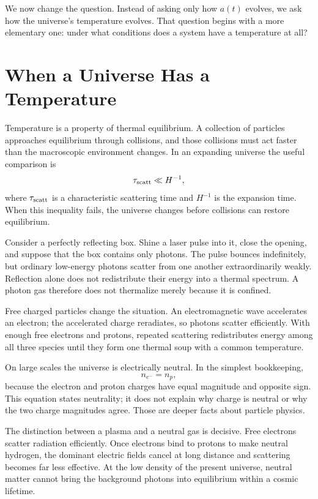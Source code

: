 We now change the question. Instead of asking only how \(a(t)\) evolves, we ask how the universe's temperature evolves. That question begins with a more elementary one: under what conditions does a system have a temperature at all?

\section{When a Universe Has a Temperature}

Temperature is a property of thermal equilibrium. A collection of particles approaches equilibrium through collisions, and those collisions must act faster than the macroscopic environment changes. In an expanding universe the useful comparison is
\begin{equation}
\tau_{\rm scatt}\ll H^{-1},
\label{eq:c07-equilibrium-condition}
\end{equation}
where \(\tau_{\rm scatt}\) is a characteristic scattering time and \(H^{-1}\) is the expansion time. When this inequality fails, the universe changes before collisions can restore equilibrium.

Consider a perfectly reflecting box. Shine a laser pulse into it, close the opening, and suppose that the box contains only photons. The pulse bounces indefinitely, but ordinary low-energy photons scatter from one another extraordinarily weakly. Reflection alone does not redistribute their energy into a thermal spectrum. A photon gas therefore does not thermalize merely because it is confined.

Free charged particles change the situation. An electromagnetic wave accelerates an electron; the accelerated charge reradiates, so photons scatter efficiently. With enough free electrons and protons, repeated scattering redistributes energy among all three species until they form one thermal soup with a common temperature.

On large scales the universe is electrically neutral. In the simplest bookkeeping,
\begin{equation}
n_{e^-}=n_p,
\label{eq:c07-neutrality}
\end{equation}
because the electron and proton charges have equal magnitude and opposite sign. This equation states neutrality; it does not explain why charge is neutral or why the two charge magnitudes agree. Those are deeper facts about particle physics.

The distinction between a plasma and a neutral gas is decisive. Free electrons scatter radiation efficiently. Once electrons bind to protons to make neutral hydrogen, the dominant electric fields cancel at long distance and scattering becomes far less effective. At the low density of the present universe, neutral matter cannot bring the background photons into equilibrium within a cosmic lifetime.

